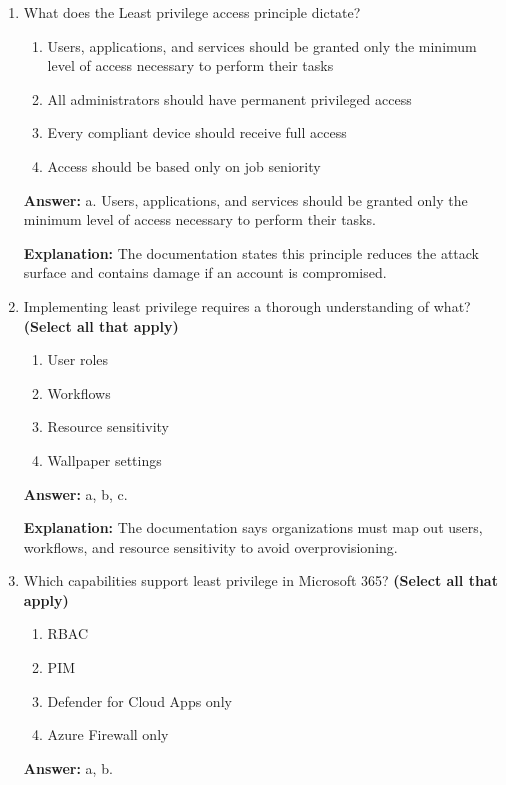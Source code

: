 \documentclass[10pt]{article}
\begin{document}
\begin{enumerate}[leftmargin=*]
\textbf{Explanation:} The documentation uses this as a lower-risk scenario compared to access from a personal device in a foreign location.

\item What does the Least privilege access principle dictate?
\begin{enumerate}[label=\alph*., leftmargin=1.5em]
\item Users, applications, and services should be granted only the minimum level of access necessary to perform their tasks
\item All administrators should have permanent privileged access
\item Every compliant device should receive full access
\item Access should be based only on job seniority
\end{enumerate}
\textbf{Answer:} a. Users, applications, and services should be granted only the minimum level of access necessary to perform their tasks.

\textbf{Explanation:} The documentation states this principle reduces the attack surface and contains damage if an account is compromised.

\item Implementing least privilege requires a thorough understanding of what? \textbf{(Select all that apply)}
\begin{enumerate}[label=\alph*., leftmargin=1.5em]
\item User roles
\item Workflows
\item Resource sensitivity
\item Wallpaper settings
\end{enumerate}
\textbf{Answer:} a, b, c.

\textbf{Explanation:} The documentation says organizations must map out users, workflows, and resource sensitivity to avoid overprovisioning.

\item Which capabilities support least privilege in Microsoft 365? \textbf{(Select all that apply)}
\begin{enumerate}[label=\alph*., leftmargin=1.5em]
\item RBAC
\item PIM
\item Defender for Cloud Apps only
\item Azure Firewall only
\end{enumerate}
\textbf{Answer:} a, b.


\end{enumerate}
\end{document}
